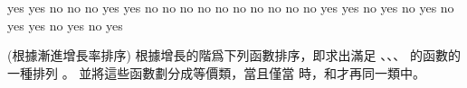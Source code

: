 \bTABLE[align=center]
\bTABLEhead
\bTR
	\bTH {} \eTH
	\bTH {} \eTH
	\bTH {} \eTH
	\bTH {} \eTH
	\bTH \m{\Omega} \eTH
	\bTH \m{\omega} \eTH
	\bTH \m{\Theta} \eTH
\eTR
\eTABLEhead
\bTABLEbody
\bTR
	\bTD {} \eTD
	\bTD {} \eTD
	\bTD\startANSWER yes \stopANSWER\eTD
	\bTD\startANSWER yes \stopANSWER\eTD
	\bTD\startANSWER no \stopANSWER\eTD
	\bTD\startANSWER no \stopANSWER\eTD
	\bTD\startANSWER no \stopANSWER\eTD
\eTR
\bTR
	\bTD {} \eTD
	\bTD {} \eTD
	\bTD\startANSWER yes \stopANSWER\eTD
	\bTD\startANSWER yes \stopANSWER\eTD
	\bTD\startANSWER no \stopANSWER\eTD
	\bTD\startANSWER no \stopANSWER\eTD
	\bTD\startANSWER no \stopANSWER\eTD
\eTR
\bTR
	\bTD {} \eTD
	\bTD {} \eTD
	\bTD\startANSWER no \stopANSWER\eTD
	\bTD\startANSWER no \stopANSWER\eTD
	\bTD\startANSWER no \stopANSWER\eTD
	\bTD\startANSWER no \stopANSWER\eTD
	\bTD\startANSWER no \stopANSWER\eTD
\eTR
\bTR
	\bTD {} \eTD
	\bTD {} \eTD
	\bTD\startANSWER no \stopANSWER\eTD
	\bTD\startANSWER no \stopANSWER\eTD
	\bTD\startANSWER yes \stopANSWER\eTD
	\bTD\startANSWER yes \stopANSWER\eTD
	\bTD\startANSWER no \stopANSWER\eTD
\eTR
\bTR
	\bTD {} \eTD
	\bTD {} \eTD
	\bTD\startANSWER yes \stopANSWER\eTD
	\bTD\startANSWER no \stopANSWER\eTD
	\bTD\startANSWER yes \stopANSWER\eTD
	\bTD\startANSWER no \stopANSWER\eTD
	\bTD\startANSWER yes \stopANSWER\eTD
\eTR
\bTR
	\bTD {} \eTD
	\bTD {} \eTD
	\bTD\startANSWER yes \stopANSWER\eTD
	\bTD\startANSWER no \stopANSWER\eTD
	\bTD\startANSWER yes \stopANSWER\eTD
	\bTD\startANSWER no \stopANSWER\eTD
	\bTD\startANSWER yes \stopANSWER\eTD
\eTR
\eTABLEbody
\eTABLE
\stopPROBLEM

\startPROBLEM
(根據漸進增長率排序)
\startigBase[a]
\startitem
根據增長的階爲下列函數排序，即求出滿足
、、\m{\ldots}、
的函數的一種排列 。
並將這些函數劃分成等價類，當且僅當 時，和才再同一類中。

\bTABLE[align=center]
\bTR \bTD {} \eTD \bTD {} \eTD \bTD {} \eTD \bTD {} \eTD \bTD {} \eTD \bTD {} \eTD \eTR
\bTR \bTD {} \eTD \bTD {} \eTD \bTD {} \eTD \bTD {} \eTD \bTD {} \eTD \bTD {} \eTD \eTR
\bTR \bTD {} \eTD \bTD {} \eTD \bTD {} \eTD \bTD {} \eTD \bTD {} \eTD \bTD {} \eTD \eTR
\bTR \bTD {} \eTD \bTD {} \eTD \bTD {} \eTD \bTD {} \eTD \bTD {} \eTD \bTD {} \eTD \eTR
\bTR \bTD {} \eTD \bTD {} \eTD \bTD {} \eTD \bTD {} \eTD \bTD {} \eTD \bTD {} \eTD \eTR
\eTABLE
\stopitem

